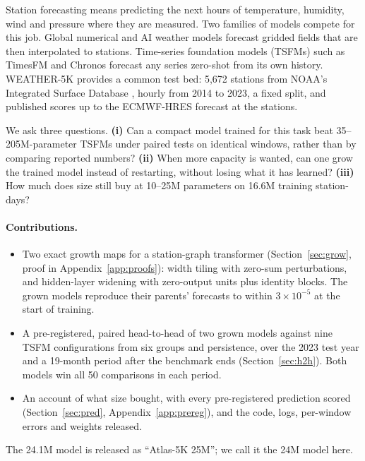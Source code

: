 \documentclass{article}
\begin{document}
Station forecasting means predicting the next hours of temperature, humidity, wind and pressure where they are
measured. Two families of models compete for this job. Global numerical and AI weather models
\citep{lam2023graphcast,bi2023pangu,lang2024aifs} forecast gridded fields that are then interpolated to stations.
Time-series foundation models (TSFMs) such as TimesFM \citep{das2024timesfm,timesfm25,timesfm3} and Chronos
\citep{ansari2024chronos,ansari2025chronos2,chronosbolt} forecast any series zero-shot from its own history.
WEATHER-5K \citep{han2026weather5k} provides a common test bed: 5,672 stations from NOAA's Integrated Surface Database
\citep{smith2011isd}, hourly from 2014 to 2023, a fixed split, and published scores up to the ECMWF-HRES forecast at the
stations.

We ask three questions. \textbf{(i)} Can a compact model trained for this task beat 35--205M-parameter TSFMs under
paired tests on identical windows, rather than by comparing reported numbers? \textbf{(ii)} When more capacity is
wanted, can one grow the trained model instead of restarting, without losing what it has learned? \textbf{(iii)} How
much does size still buy at 10--25M parameters on 16.6M training station-days?

\paragraph{Contributions.}
\begin{itemize}
\item Two exact growth maps for a station-graph transformer (Section~\ref{sec:grow}, proof in Appendix~\ref{app:proofs}):
width tiling with zero-sum perturbations, and hidden-layer widening with zero-output units plus identity blocks. The
grown models reproduce their parents' forecasts to within $3\times10^{-5}$ at the start of training.
\item A pre-registered, paired head-to-head of two grown models against nine TSFM configurations from six groups and
persistence, over the 2023 test year and a 19-month period after the benchmark ends (Section~\ref{sec:h2h}). Both
models win all 50 comparisons in each period.
\item An account of what size bought, with every pre-registered prediction scored (Section~\ref{sec:pred},
Appendix~\ref{app:prereg}), and the code, logs, per-window errors and weights released.
\end{itemize}
The 24.1M model is released as ``Atlas-5K 25M''; we call it the 24M model here.
\end{document}
